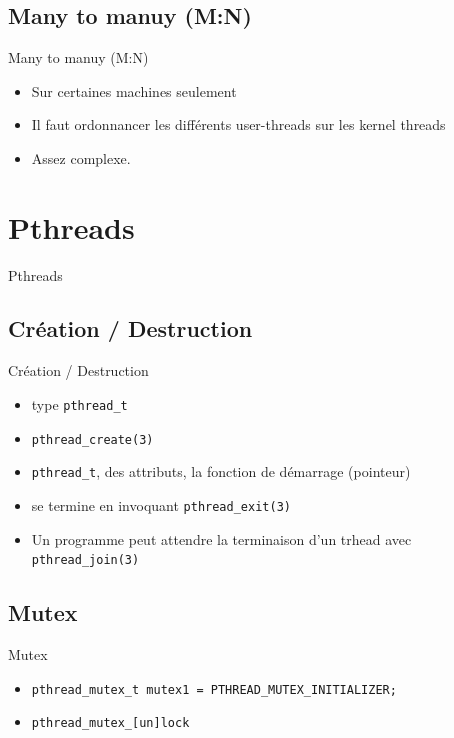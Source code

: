 \section{\sectitle}
\begin{frame}{\sectitle}
    \def\subsectitle{Many to manuy (M:N)}
    \subsection{\subsectitle}
    \begin{block}{\subsectitle}
        \begin{itemize}
            \item Sur certaines machines seulement
            \item Il faut ordonnancer les différents user-threads sur les kernel
                threads
            \item Assez complexe.
        \end{itemize}
    \end{block}
\end{frame}


\def\sectitle{Pthreads}
\section{\sectitle}
\begin{frame}[containsverbatim]{\sectitle}
    \def\subsectitle{Création / Destruction}
    \subsection{\subsectitle}
    \begin{block}{\subsectitle}
        \begin{itemize}
            \item type \verb+pthread_t+
            \item \verb+pthread_create(3)+ 
            \item \verb+pthread_t+, des attributs, la fonction de démarrage
                (pointeur)
            \item se termine en invoquant \verb+pthread_exit(3)+
            \item Un programme peut attendre la terminaison d'un trhead avec
                \verb+pthread_join(3)+
        \end{itemize}
    \end{block}


    \def\subsectitle{Mutex}
    \subsection{\subsectitle}
    \begin{block}{\subsectitle}
        \begin{itemize}
            \item \verb+pthread_mutex_t mutex1 = PTHREAD_MUTEX_INITIALIZER;+
            \item \verb+pthread_mutex_[un]lock+
        \end{itemize}
    \end{block}
\end{frame}


